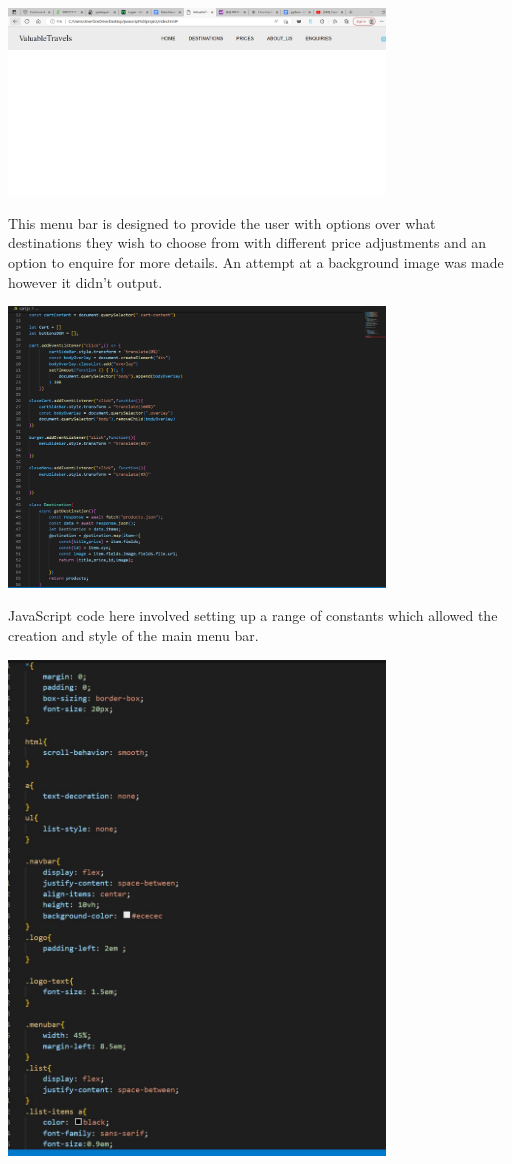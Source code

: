 \documentclass[a4paper, 11pt]{report}
\begin{document}
\includegraphics[width=0.75\textwidth]{image.png}

This menu bar is designed to provide the user with options over what destinations they wish to choose from with different price adjustments and an option to enquire for more details. An attempt at a background image was made however it didn't output.

\includegraphics[width=0.75\textwidth]{Capture.JPG}

JavaScript code here involved setting up a range of constants which allowed the creation and style of the main menu bar.  

\includegraphics[width=0.75\textwidth]{css.JPG}
\end{document}
